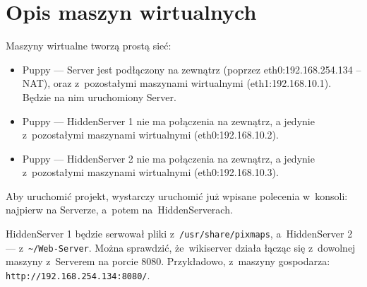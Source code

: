 \documentclass[a4paper,notitlepage]{article}
\begin{document}
\pagestyle{fancy}
\section*{Opis maszyn wirtualnych}
Maszyny wirtualne tworzą prostą sieć:
\begin{itemize}
\item Puppy --- Server jest podłączony na zewnątrz (poprzez eth0:192.168.254.134 -- NAT),
oraz z~pozostałymi maszynami wirtualnymi (eth1:192.168.10.1). 
Będzie na nim uruchomiony Server.
\item Puppy --- HiddenServer 1 nie ma połączenia na zewnątrz, a jedynie 
z~pozostałymi maszynami wirtualnymi (eth0:192.168.10.2).
\item Puppy --- HiddenServer 2 nie ma połączenia na zewnątrz, a jedynie 
z~pozostałymi maszynami wirtualnymi (eth0:192.168.10.3).
\end{itemize}
Aby uruchomić projekt, wystarczy uruchomić już wpisane polecenia w~konsoli: 
najpierw na Serverze, a~potem na~HiddenServerach.

HiddenServer 1 będzie serwował pliki z~\verb!/usr/share/pixmaps!,
a~HiddenServer 2 --- z~\verb!~/Web-Server!. Można sprawdzić, że~wikiserver 
działa łącząc się z~dowolnej maszyny z~Serverem na porcie 8080. 
Przykładowo, z~maszyny gospodarza: \verb!http://192.168.254.134:8080/!.
\end{document}
